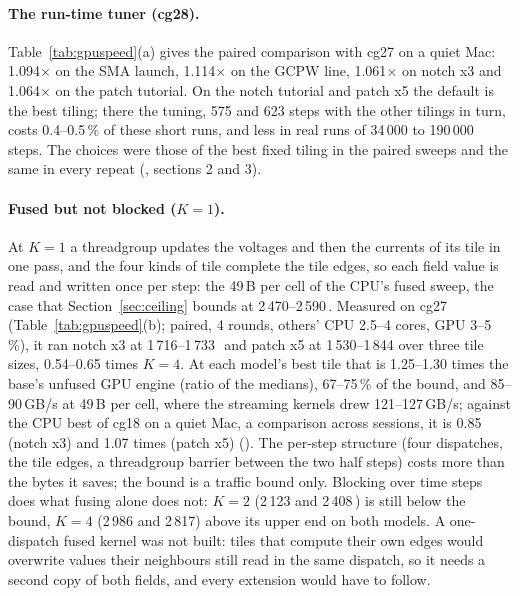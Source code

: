 \paragraph{The run-time tuner (cg28).} Table~\ref{tab:gpuspeed}(a) gives the paired comparison with cg27 on a quiet
Mac: 1.094$\times$ on the SMA launch, 1.114$\times$ on the GCPW line, 1.061$\times$ on notch x3 and 1.064$\times$ on
the patch tutorial. On the notch tutorial and patch x5 the default is the best tiling; there the tuning, 575 and 623
steps with the other tilings in turn, costs 0.4--0.5\,\% of these short runs, and less in real runs of 34\,000 to
190\,000 steps. The choices were those of the best fixed tiling in the paired sweeps and the same in every repeat
(, sections 2 and 3).

\paragraph{Fused but not blocked ($K=1$).} At $K=1$ a threadgroup updates the voltages and then the currents of its
tile in one pass, and the four kinds of tile complete the tile edges, so each field value is read and written once
per step: the 49\,B per cell of the CPU's fused sweep, the case that Section~\ref{sec:ceiling} bounds at
2\,470--2\,590\,\MC. Measured on cg27 (Table~\ref{tab:gpuspeed}(b); paired, 4 rounds, others' CPU 2.5--4 cores, GPU
3--5\,\%), it ran notch x3 at 1\,716--1\,733\,\MC\ and patch x5 at 1\,530--1\,844 over three tile sizes, 0.54--0.65
times $K=4$. At each model's best tile that is 1.25--1.30 times the base's unfused GPU engine (ratio of the medians),
67--75\,\% of the bound, and 85--90\,GB/s at 49\,B per cell, where the streaming kernels drew 121--127\,GB/s; against
the CPU best of cg18 on a quiet Mac, a comparison across sessions, it is 0.85 (notch x3) and 1.07 times (patch x5)
(). The per-step structure (four dispatches, the tile edges, a
threadgroup barrier between the two half steps) costs more than the bytes it saves; the bound is a traffic bound only.
Blocking over time steps does what fusing alone does not: $K=2$ (2\,123 and 2\,408\,\MC) is still below the bound,
$K=4$ (2\,986 and 2\,817) above its upper end on both models. A one-dispatch fused kernel was not built: tiles that
compute their own edges would overwrite values their neighbours still read in the same dispatch, so it needs a second
copy of both fields, and every extension would have to follow.

